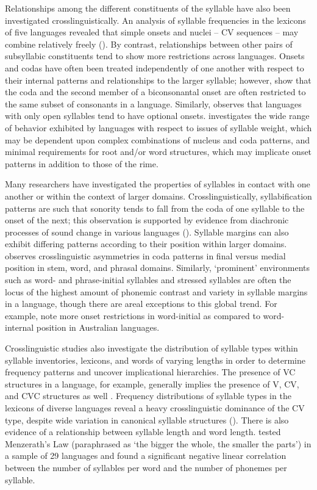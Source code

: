   Relationships among the different constituents of the syllable have also been investigated crosslinguistically. An analysis of syllable frequencies in the lexicons of five languages revealed that simple onsets and nuclei -- CV sequences -- may combine relatively freely (\citealt{MaddiesonPrecoda1992}). By contrast, relationships between other pairs of subsyllabic constituents tend to show more restrictions across languages. Onsets and codas have often been treated independently of one another with respect to their internal patterns and relationships to the larger syllable; however, \citet{DavisBaertsch2011} show that the coda and the second member of a biconsonantal onset are often restricted to the same subset of consonants in a language. Similarly, \citet{Blevins2006} observes that languages with only open syllables tend to have optional onsets. \citet{Gordon2006} investigates the wide range of behavior exhibited by languages with respect to issues of syllable weight, which may be dependent upon complex combinations of nucleus and coda patterns, and minimal requirements for root and/or word structures, which may implicate onset patterns in addition to those of the rime.

  Many researchers have investigated the properties of syllables in contact with one another or within the context of larger domains. Crosslinguistically, syllabification patterns are such that sonority tends to fall from the coda of one syllable to the onset of the next; this observation is supported by evidence from diachronic processes of sound change in various languages (\citealt{Hooper1976,MurrayVennemann1983}). Syllable margins can also exhibit differing patterns according to their position within larger domains. \citet{Côté2011} observes crosslinguistic asymmetries in coda patterns in final versus medial position in stem, word, and phrasal domains. Similarly, ‘prominent’ environments such as word- and phrase-initial syllables and stressed syllables are often the locus of the highest amount of phonemic contrast and variety in syllable margins in a language, though there are areal exceptions to this global trend. For example, \citet{GasserBowern2014} note more onset restrictions in word-initial as compared to word-internal position in Australian languages.

  Crosslinguistic studies also investigate the distribution of syllable types within syllable inventories, lexicons, and words of varying lengths in order to determine frequency patterns and uncover implicational hierarchies. The presence of VC structures in a language, for example, generally implies the presence of V, CV, and CVC structures as well \citep{Blevins1995}. Frequency distributions of syllable types in the lexicons of diverse languages reveal a heavy crosslinguistic dominance of the CV type, despite wide variation in canonical syllable structures (\citealt{Rousset2004,ValléeEtAl2009}). There is also evidence of a relationship between syllable length and word length. \citet{FenkFenkOczlon1993} tested Menzerath’s Law (paraphrased as ‘the bigger the whole, the smaller the parts’) in a sample of 29 languages and found a significant negative linear correlation between the number of syllables per word and the number of phonemes per syllable.

